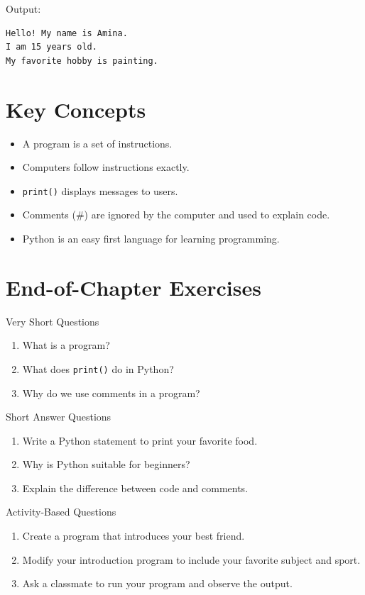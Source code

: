 Output:

\begin{verbatim}
Hello! My name is Amina.
I am 15 years old.
My favorite hobby is painting.
\end{verbatim}

\section{Key Concepts}

\begin{itemize}
    \item A program is a set of instructions.
    \item Computers follow instructions exactly.
    \item \texttt{print()} displays messages to users.
    \item Comments (\#) are ignored by the computer and used to explain code.
    \item Python is an easy first language for learning programming.
\end{itemize}

\section{End-of-Chapter Exercises}

\begin{exercise}{Very Short Questions}
\begin{enumerate}
    \item What is a program?
    \item What does \texttt{print()} do in Python?
    \item Why do we use comments in a program?
\end{enumerate}
\end{exercise}

\begin{exercise}{Short Answer Questions}
\begin{enumerate}
    \item Write a Python statement to print your favorite food.
    \item Why is Python suitable for beginners?
    \item Explain the difference between code and comments.
\end{enumerate}
\end{exercise}

\begin{exercise}{Activity-Based Questions}
\begin{enumerate}
    \item Create a program that introduces your best friend.
    \item Modify your introduction program to include your favorite subject and sport.
    \item Ask a classmate to run your program and observe the output.
\end{enumerate}
\end{exercise}

